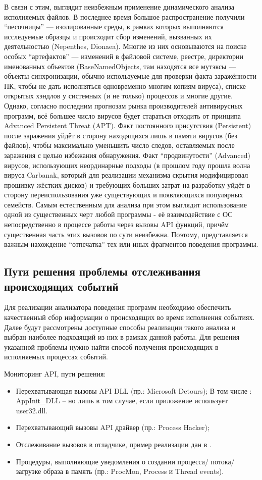 В связи с этим, выглядит неизбежным применение динамического анализа исполняемых файлов. В последнее время большое распространение получили ``песочницы'' --- изолированные среды, в рамках которых выполняются исследуемые образцы и происходит сбор изменений, вызванных их деятельностью (Nepenthes, Dionaea). Многие из них основываются на поиске особых ``артефактов'' --- изменений в файловой системе, реестре, директории именованных объектов (BaseNamedObjects, там находятся все мутэксы --- объекты синхронизации, обычно используемые для проверки факта заражённости ПК, чтобы не дать исполняться одновременно многим копиям вируса), списке открытых хэндлов у системных (и не только) процессов и многие другие. Однако, согласно последним прогнозам рынка производителей антивирусных программ\cite{KASPERKSYBULLETIN}, всё большее число вирусов будет стараться отходить от принципа Advanced Persistent Threat (APT). Факт постоянного присутствия (Persistent) после заражения уйдёт в сторону находящихся лишь в памяти вирусов (без файлов), чтобы максимально уменьшить число следов, оставляемых после заражения с целью избежания обнаружения. Факт ``продвинутости'' (Advanced) вирусов, использующих неординарные подходы (в прошлом году прошла волна вируса Carbanak\cite{CARBANAK}, который для реализации механизма скрытия модифицировал прошивку жёстких дисков) и требующих больших затрат на разработку уйдёт в сторону переиспользования уже существующих и появляющихся популярных семейств. Самым естественным для анализа при этом выглядит использование одной из существенных черт любой программы - её взаимодействие с ОС непосредственно в процессе работы через вызовы API функций, причём существенная часть этих вызовов по сути неизбежна. Поэтому, представляется важным нахождение ``отпечатка'' тех или иных фрагментов поведения программы.

\subsection {Пути решения проблемы отслеживания происходящих событий}
Для реализации анализатора поведения программ необходимо обеспечить качественный сбор информации о происходящих во время исполнения событиях. Далее будут рассмотрены доступные способы реализации такого анализа и выбран наиболее подходящий из них в рамках данной работы.
Для решения указанной проблемы нужно найти способ получения происходящих в исполняемых процессах событий. 

Мониторинг API, пути решения:
\begin {itemize}
	\item Перехватывающая вызовы API DLL (пр.: Microsoft Detours);
	В том числе : AppInit\_DLL – но лишь в том случае, если приложение использует user32.dll.
	\item Перехватывающий вызовы API драйвер (пр.: Process Hacker);
	\item Отслеживание вызовов в отладчике, пример реализации дан в \cite{MALWAREBOOK}.
	\item Процедуры, выполняющие уведомления о создании процесса/ потока/ загрузке образа в память (пр.:
 	ProcMon, Process и Thread events).
\end {itemize}

